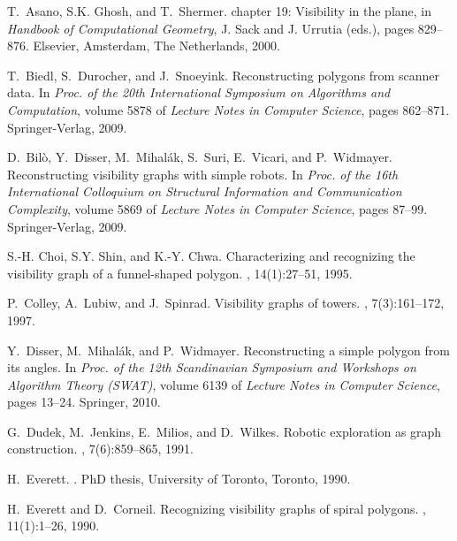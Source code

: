 \documentclass[11pt]{article}
\begin{document}
\begin{thebibliography}{10}

T.~Asano, S.K. Ghosh, and T.~Shermer.
\newblock chapter 19: Visibility in the plane, in {\em Handbook of
  Computational Geometry}, J. Sack and J. Urrutia (eds.), pages 829--876.
\newblock Elsevier, Amsterdam, The Netherlands, 2000.

T.~Biedl, S.~Durocher, and J.~Snoeyink.
\newblock Reconstructing polygons from scanner data.
\newblock In {\em Proc. of the 20th International Symposium on Algorithms and
  Computation}, volume 5878 of {\em Lecture Notes in Computer Science}, pages
  862--871. Springer-Verlag, 2009.

D.~Bil\`o, Y.~Disser, M.~Mihal\'ak, S.~Suri, E.~Vicari, and P.~Widmayer.
\newblock Reconstructing visibility graphs with simple robots.
\newblock In {\em Proc. of the 16th International Colloquium on Structural
  Information and Communication Complexity}, volume 5869 of {\em Lecture Notes
  in Computer Science}, pages 87--99. Springer-Verlag, 2009.

S.-H. Choi, S.Y. Shin, and K.-Y. Chwa.
\newblock Characterizing and recognizing the visibility graph of a
  funnel-shaped polygon.
, 14(1):27--51, 1995.

P.~Colley, A.~Lubiw, and J.~Spinrad.
\newblock Visibility graphs of towers.
, 7(3):161--172,
  1997.

Y.~Disser, M.~Mihal\'ak, and P.~Widmayer.
\newblock Reconstructing a simple polygon from its angles.
\newblock In {\em Proc. of the 12th Scandinavian Symposium and Workshops on
  Algorithm Theory (SWAT)}, volume 6139 of {\em Lecture Notes in Computer
  Science}, pages 13--24. Springer, 2010.

G.~Dudek, M.~Jenkins, E.~Milios, and D.~Wilkes.
\newblock Robotic exploration as graph construction.
, 7(6):859--865,
  1991.

H.~Everett.
.
\newblock PhD thesis, University of Toronto, Toronto, 1990.

H.~Everett and D.~Corneil.
\newblock Recognizing visibility graphs of spiral polygons.
, 11(1):1--26, 1990.


\end{thebibliography}
\end{document}
